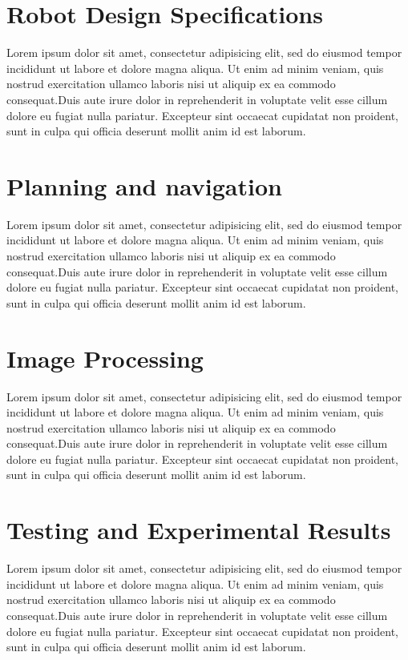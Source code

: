 \documentclass[twocolumn]{article}
\begin{document}
    \section{Robot Design Specifications}
        Lorem ipsum dolor sit amet, consectetur adipisicing elit, sed do eiusmod
        tempor incididunt ut labore et dolore magna aliqua. Ut enim ad minim veniam,
        quis nostrud exercitation ullamco laboris nisi ut aliquip ex ea commodo
        consequat.Duis aute irure dolor in reprehenderit in voluptate velit esse
        cillum dolore eu fugiat nulla pariatur. Excepteur sint occaecat cupidatat non
        proident, sunt in culpa qui officia deserunt mollit anim id est laborum.
    
    \section{Planning and navigation}
        Lorem ipsum dolor sit amet, consectetur adipisicing elit, sed do eiusmod
        tempor incididunt ut labore et dolore magna aliqua. Ut enim ad minim veniam,
        quis nostrud exercitation ullamco laboris nisi ut aliquip ex ea commodo
        consequat.Duis aute irure dolor in reprehenderit in voluptate velit esse
        cillum dolore eu fugiat nulla pariatur. Excepteur sint occaecat cupidatat non
        proident, sunt in culpa qui officia deserunt mollit anim id est laborum.
    
    \section{Image Processing}
        Lorem ipsum dolor sit amet, consectetur adipisicing elit, sed do eiusmod
        tempor incididunt ut labore et dolore magna aliqua. Ut enim ad minim veniam,
        quis nostrud exercitation ullamco laboris nisi ut aliquip ex ea commodo
        consequat.Duis aute irure dolor in reprehenderit in voluptate velit esse
        cillum dolore eu fugiat nulla pariatur. Excepteur sint occaecat cupidatat non
        proident, sunt in culpa qui officia deserunt mollit anim id est laborum.
     
     \section{Testing and Experimental Results}
        Lorem ipsum dolor sit amet, consectetur adipisicing elit, sed do eiusmod
        tempor incididunt ut labore et dolore magna aliqua. Ut enim ad minim veniam,
        quis nostrud exercitation ullamco laboris nisi ut aliquip ex ea commodo
        consequat.Duis aute irure dolor in reprehenderit in voluptate velit esse
        cillum dolore eu fugiat nulla pariatur. Excepteur sint occaecat cupidatat non
        proident, sunt in culpa qui officia deserunt mollit anim id est laborum.
    
    
    
\end{document}
